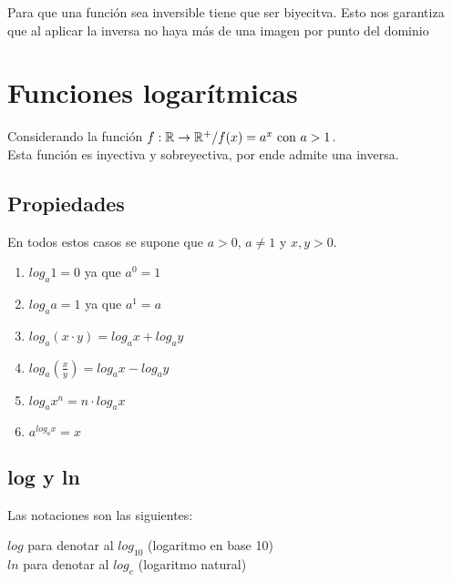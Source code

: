 Para que una función sea inversible tiene que ser biyecitva. Esto nos garantiza que al aplicar la inversa no haya más de una imagen por punto del dominio



\section{Funciones logarítmicas}
Considerando la función $f : {\mathbb{R}} \rightarrow {\mathbb{R}}^+ / f(x) = a^x \text{ con } a > 1$. \\
Esta función es inyectiva y sobreyectiva, por ende admite una inversa.

\subsection{Propiedades}
En todos estos casos se supone que $a > 0$, $a \neq 1$ y $x, y > 0$.
\begin{enumerate}
    \item $log_a 1 = 0$ ya que $a^0 = 1$
    \item $log_a a = 1$ ya que $a^1 = a$
    \item $log_a(x \cdot y) = log_a x + log_a y$
    \item $log_a \left(\frac{x}{y}\right) = log_a x - log_a y$
    \item $log_a x^n = n \cdot log_a x$
    \item $a^{log_a x} = x$
\end{enumerate}


\subsection{log y ln}
Las notaciones son las siguientes:
\begin{center}
    $log$ para denotar al $log_{10}$ (logaritmo en base 10)\\
    $ln$ para denotar al $log_e$ (logaritmo natural)
\end{center}

